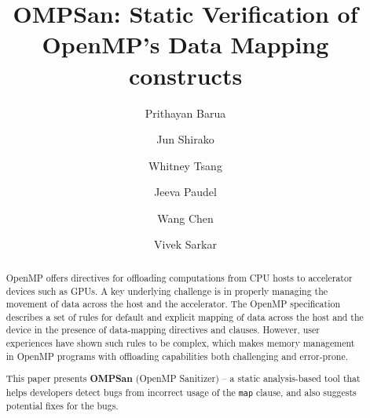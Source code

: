 \documentclass[runningheads]{llncs}
\begin{document}

%
\title{OMPSan: Static Verification of OpenMP's Data Mapping constructs}
%
%
\author{Prithayan Barua \and
Jun Shirako \and
Whitney Tsang \and
Jeeva Paudel \and
Wang Chen \and
Vivek Sarkar
}
%
%

\maketitle              %
%


 \begin{abstract}
OpenMP offers directives for offloading computations from CPU hosts to accelerator devices such as GPUs. A key underlying challenge is in properly managing the movement of data across the host and the accelerator. The OpenMP specification describes a set of rules for default and explicit mapping of data across the host and the device in the presence of data-mapping directives and clauses. However, user experiences have shown such rules to be complex, which makes memory management in OpenMP programs with offloading capabilities both challenging and error-prone.

This paper presents \textbf{OMPSan} (OpenMP Sanitizer) -- a static analysis-based tool that helps developers detect bugs from incorrect usage of the \texttt{map} clause, and also suggests potential fixes for the bugs. 

\end{abstract}
%
%
%
\end{document}
